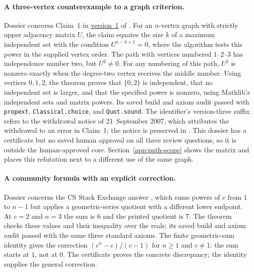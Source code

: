 \paragraph{A three-vertex counterexample to a graph criterion.}
Dossier  concerns Claim~1 in \href{https://arxiv.org/abs/0709.2689v1}{version~1} of \citet{kettani2007independent}. For an $n$-vertex graph with strictly upper adjacency matrix $U$, the claim equates the size $k$ of a maximum independent set with the condition $U^{n-k+1}=0$, where the algorithm tests this power in the supplied vertex order. The path with vertices numbered $1$--$2$--$3$ has independence number two, but $U^2\ne0$. For any numbering of this path, $U^2$ is nonzero exactly when the degree-two vertex receives the middle number. Using vertices $0,1,2$, the theorem  proves that $\{0,2\}$ is independent, that no independent set is larger, and that the specified power is nonzero, using Mathlib's independent sets and matrix powers. Its saved build and axiom audit passed with \texttt{propext}, \texttt{Classical.choice}, and \texttt{Quot.sound}. The identifier's version-three suffix refers to the withdrawal notice of 21~September 2007, which attributes the withdrawal to an error in Claim~1; the notice is preserved in . This dossier has a certificate but no saved human approval on all three review questions, so it is outside the human-approved core. Section~\ref{app:path-scope} shows the matrix and places this refutation next to a different use of the same graph.

\paragraph{A community formula with an explicit correction.}
Dossier  concerns the CS Stack Exchange answer , which sums powers of $c$ from $1$ to $n-1$ but applies a geometric-series quotient with a different lower endpoint. At $c=2$ and $n=3$ the sum is $6$ and the printed quotient is $7$. The theorem  checks these values and their inequality over the reals; its saved build and axiom audit passed with the same three standard axioms. The finite geometric-sum identity gives the correction $(c^n-c)/(c-1)$ for $n\ge1$ and $c\ne1$: the sum starts at $1$, not at $0$. The certificate proves the concrete discrepancy; the identity supplies the general correction.

